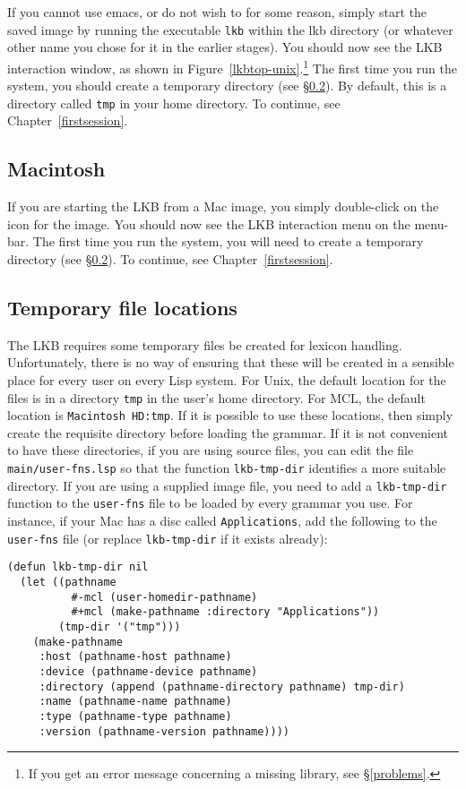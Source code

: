 \documentclass[12pt]{report}
\newcommand{\filename}[1]{{\tt #1}}
\newcommand{\functionname}[1]{{\tt #1}}
\begin{document}
If you cannot use emacs, or do not wish to for some reason,
simply start the saved image by running the executable
\filename{lkb} within the lkb directory (or whatever
other name you chose for it in the earlier stages).
You
should now see the LKB interaction window, as shown in 
Figure~\ref{lkbtop-unix}.\footnote{If 
you get an error message concerning a missing library,
see \S\ref{problems}.}
The first time you run the system, you should
create a temporary directory (see \S\ref{tempdir}).  By default, this is
a directory called \filename{tmp} in your home directory.
To continue, see Chapter~\ref{firstsession}.

\subsection{Macintosh}
\label{mcl-image}

If you are starting the LKB from a
Mac image, you simply double-click on the
icon for the image. 
You
should now see the LKB interaction menu on the menu-bar. 
The first time you run the system, you will need to
create a temporary directory (see \S\ref{tempdir}).
To continue, see Chapter~\ref{firstsession}.


\subsection{Temporary file locations}
\label{tempdir}

The LKB requires some temporary files be created for lexicon handling.  
Unfortunately, there is no way of ensuring that these will be created 
in a sensible place for every user on every Lisp system.
For
Unix, the default location for the
files is in a directory \filename{tmp} in the user's
home directory.  For MCL, the default location is \filename{Macintosh HD:tmp}.  If
it is possible to use these locations, then simply create the requisite
directory before loading the grammar.  If it is not convenient to have these
directories, if you are using source files, you can edit the file 
\filename{main/user-fns.lsp} 
so that the function \functionname{lkb-tmp-dir} identifies a more
suitable directory.  If you are using a supplied image file, you need to add a
\functionname{lkb-tmp-dir} 
function to the \filename{user-fns} file to be loaded by every grammar 
you use.  For instance,
if your Mac has a disc called \filename{Applications}, add the following
to the \filename{user-fns} file (or replace 
\functionname{lkb-tmp-dir} if it exists
already):
\begin{verbatim}
(defun lkb-tmp-dir nil 
  (let ((pathname  
          #-mcl (user-homedir-pathname)
          #+mcl (make-pathname :directory "Applications"))
        (tmp-dir '("tmp")))
    (make-pathname
     :host (pathname-host pathname) 
     :device (pathname-device pathname)
     :directory (append (pathname-directory pathname) tmp-dir)
     :name (pathname-name pathname) 
     :type (pathname-type pathname)
     :version (pathname-version pathname))))
\end{verbatim}
\end{document}
